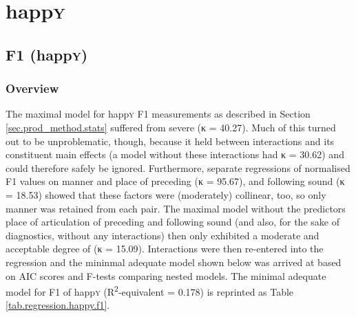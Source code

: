 	\section{happ\textrm{\textsc{y}}}
	\label{sec.prod.res.vow.happy}	

		\subsection{F1 (happ\textrm{\textsc{y}})}
		\label{sec.prod.res.vow.happy.f1}
		
			\subsubsection{Overview}
			\label{sec.prod.res.vow.happy.f1.overview}

The maximal model for happ\textsc{y} F1 measurements as described in Section \ref{sec.prod_method.stats} suffered from severe  (κ = 40.27).
Much of this  turned out to be unproblematic, though, because it held between interactions and its constituent main effects (a model without these interactions had κ = 30.62) and could therefore safely be ignored.
Furthermore, separate regressions of normalised F1 values on manner and place of preceding (κ = 95.67), and following sound (κ = 18.53) showed that these factors were (moderately) collinear, too, so only manner was retained from each pair.
The maximal model without the predictors place of articulation of preceding and following sound (and also, for the sake of diagnostics, without any interactions) then only exhibited a moderate and acceptable degree of  (κ = 15.09).
Interactions were then re-entered into the regression and the mininmal adequate model shown below was arrived at based on AIC scores and F-tests comparing nested models.
The minimal adequate model for F1 of happ\textsc{y} (R\textsuperscript{2}-equivalent = 0.178) is reprinted as Table \ref{tab.regression.happy.f1}.
		
